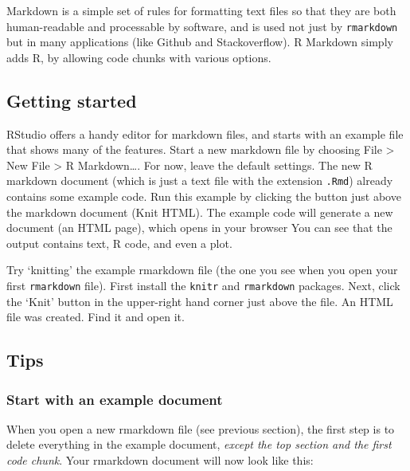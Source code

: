 \documentclass[]{book}
\let\BeginKnitrBlock\begin \let\EndKnitrBlock\end
\begin{document}
Markdown is a simple set of rules for formatting text files so that they are both human-readable and processable by software, and is used not just by \texttt{rmarkdown} but in many applications (like Github and Stackoverflow). R Markdown simply adds R, by allowing code chunks with various options.

\hypertarget{getting-started}{%
\subsection{Getting started}\label{getting-started}}

RStudio offers a handy editor for markdown files, and starts with an example file that shows many of the features. Start a new markdown file by choosing File \textgreater{} New File \textgreater{} R Markdown\ldots{}. For now, leave the default settings. The new R markdown document (which is just a text file with the extension \texttt{.Rmd}) already contains some example code. Run this example by clicking the button just above the markdown document (Knit HTML). The example code will generate a new document (an HTML page), which opens in your browser You can see that the output contains text, R code, and even a plot.

\BeginKnitrBlock{rmdtry}
Try `knitting' the example rmarkdown file (the one you see when you open your first \texttt{rmarkdown} file). First install the \texttt{knitr} and \texttt{rmarkdown} packages. Next, click the `Knit' button in the upper-right hand corner just above the file. An HTML file was created. Find it and open it.
\EndKnitrBlock{rmdtry}

\hypertarget{tips}{%
\subsection{Tips}\label{tips}}

\hypertarget{start-with-an-example-document}{%
\subsubsection*{Start with an example document}\label{start-with-an-example-document}}

When you open a new rmarkdown file (see previous section), the first step is to delete everything in the example document, \emph{except the top section and the first code chunk}. Your rmarkdown document will now look like this:
\end{document}
